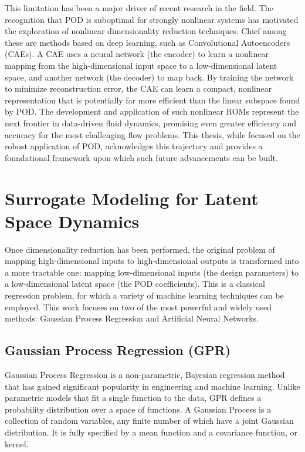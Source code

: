 This limitation has been a major driver of recent research in the field. The recognition that POD is suboptimal for strongly nonlinear systems has motivated the exploration of nonlinear dimensionality reduction techniques. Chief among these are methods based on deep learning, such as Convolutional Autoencoders (CAEs). A CAE uses a neural network (the encoder) to learn a nonlinear mapping from the high-dimensional input space to a low-dimensional latent space, and another network (the decoder) to map back. By training the network to minimize reconstruction error, the CAE can learn a compact, nonlinear representation that is potentially far more efficient than the linear subspace found by POD. The development and application of such nonlinear ROMs represent the next frontier in data-driven fluid dynamics, promising even greater efficiency and accuracy for the most challenging flow problems. This thesis, while focused on the robust application of POD, acknowledges this trajectory and provides a foundational framework upon which such future advancements can be built. 

\section{Surrogate Modeling for Latent Space Dynamics}

Once dimensionality reduction has been performed, the original problem of mapping high-dimensional inputs to high-dimensional outputs is transformed into a more tractable one: mapping low-dimensional inputs (the design parameters) to a low-dimensional latent space (the POD coefficients). This is a classical regression problem, for which a variety of machine learning techniques can be employed. This work focuses on two of the most powerful and widely used methods: Gaussian Process Regression and Artificial Neural Networks.

\subsection{Gaussian Process Regression (GPR)}

Gaussian Process Regression is a non-parametric, Bayesian regression method that has gained significant popularity in engineering and machine learning. Unlike parametric models that fit a single function to the data, GPR defines a probability distribution over a space of functions. A Gaussian Process is a collection of random variables, any finite number of which have a joint Gaussian distribution. It is fully specified by a mean function and a covariance function, or kernel.

